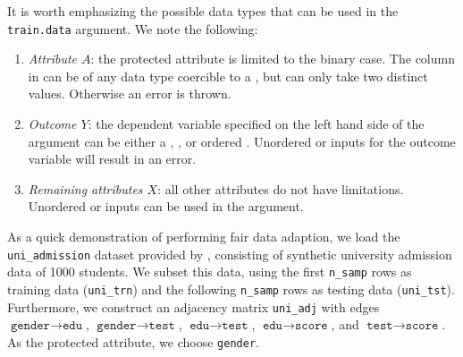 \documentclass[
  nojss]{jss}
\providecommand{\tightlist}{%
  \setlength{\itemsep}{0pt}\setlength{\parskip}{0pt}}
\begin{document}
It is worth emphasizing the possible data types that can be used in the
\texttt{train.data} argument. We note the following:

\begin{enumerate}
\def\labelenumi{(\roman{enumi})}
\tightlist
\item
  \emph{Attribute \(A\)}: the protected attribute is limited to the
  binary case. The  column in  can be
  of any data type coercible to a , but can only take two
  distinct values. Otherwise an error is thrown.
\item
  \emph{Outcome \(Y\)}: the dependent variable specified on the left
  hand side of the  argument can be either a
  , ,  or ordered
  . Unordered  or  inputs for
  the outcome variable will result in an error.
\item
  \emph{Remaining attributes \(X\)}: all other attributes do not have
  limitations. Unordered  or  inputs can be
  used in the  argument.
\end{enumerate}

As a quick demonstration of performing fair data adaption, we load the
\texttt{uni\_admission} dataset provided by , consisting
of synthetic university admission data of 1000 students. We subset this
data, using the first \texttt{n\_samp} rows as training data
(\texttt{uni\_trn}) and the following \texttt{n\_samp} rows as testing
data (\texttt{uni\_tst}). Furthermore, we construct an adjacency matrix
\texttt{uni\_adj} with edges \(\texttt{gender} \to \texttt{edu}\),
\(\texttt{gender} \to \texttt{test}\),
\(\texttt{edu} \to \texttt{test}\), \(\texttt{edu} \to \texttt{score}\),
and \(\texttt{test} \to \texttt{score}\). As the protected attribute, we
choose \texttt{gender}.
\end{document}
